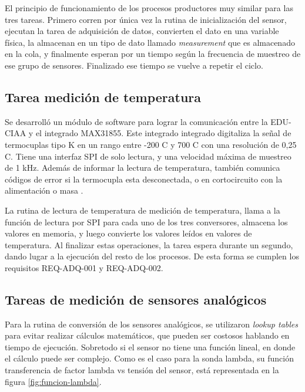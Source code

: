 El principio de funcionamiento de los procesos productores muy similar para las tres tareas. Primero corren por única vez la rutina de inicialización del sensor, ejecutan la tarea de adquisición de datos, convierten el dato en una variable física, la almacenan en un tipo de dato llamado \textit{measurement} que es almacenado en la cola, y finalmente esperan por un tiempo según la frecuencia de muestreo de ese grupo de sensores. Finalizado ese tiempo se vuelve a repetir el ciclo.

\subsection{Tarea medición de temperatura}

Se desarrolló un módulo de software para lograr la comunicación entre la EDU-CIAA y el integrado MAX31855. Este integrado integrado digitaliza la señal de termocuplas tipo K en un rango entre -200 \degree C y 700 \degree C con una resolución de 0,25 \degree C. Tiene una interfaz SPI de solo lectura, y una velocidad máxima de muestreo de 1 kHz. Además de informar la lectura de temperatura, también comunica códigos de error si la termocupla esta desconectada, o en cortocircuito con la alimentación o masa \cite{MAX31855}. 

La rutina de lectura de temperatura de medición de temperatura, llama a la función de lectura por SPI para cada uno de los tres conversores, almacena los valores en memoria, y luego convierte los valores leídos en valores de temperatura. Al finalizar estas operaciones, la tarea espera durante un segundo, dando lugar a la ejecución del resto de los procesos. De esta forma se cumplen los requisitos REQ-ADQ-001 y REQ-ADQ-002.

\subsection{Tareas de medición de sensores analógicos}

Para la rutina de conversión de los sensores analógicos, se utilizaron \textit{lookup tables} para evitar realizar cálculos matemáticos, que pueden ser costosos hablando en tiempo de ejecución. Sobretodo si el sensor no tiene una función lineal, en donde el cálculo puede ser complejo. Como es el caso para la sonda lambda, su función transferencia de factor lambda vs tensión del sensor, está representada en la figura \ref{fig:funcion-lambda}.

